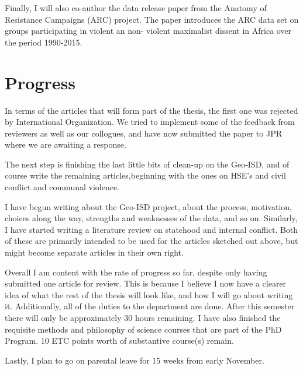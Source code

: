 \documentclass[12pt]{article}
\begin{document}
Finally, I will also co-author the data release paper from the Anatomy of 
Resistance Campaigns (ARC) project.
The paper introduces the ARC data set on groups participating in violent an non-
violent maximalist dissent in Africa over the period 1990-2015.




\section{Progress}

In terms of the articles that will form part of the thesis, the first one was
rejected by International Organization. We tried to implement some of the
feedback from reviewers as well as our collogues, and have now submitted the
paper to JPR where we are awaiting a response.  

The next step is finishing the last little bits of clean-up on the Geo-ISD, and
of course write the remaining articles,beginning with the ones on HSE's and
civil conflict and communal violence. 

I have begun writing about the Geo-ISD project, about the process, motivation,
choices along the way, strengths and weaknesses of the data, and so on. Similarly, I have
started writing a literature review on statehood and internal conflict. Both of
these are primarily intended to be used for the articles sketched out above,
but might become separate articles in their own right.

Overall I am content with the rate of progress so far, despite only having 
submitted one article for review.
This is because I believe I now have a clearer idea of what the rest of the 
thesis will look like, and how I will go about writing it.
Additionally, all of the duties to the department are done.
After this semester there will only be approximately 30 hours remaining.
I have also finished the requisite methods and philosophy of science courses 
that are part of the PhD Program.
10 ETC points worth of substantive course(s) remain.

Lastly, I plan to go on parental leave for 15 weeks from early November.

\pagebreak


\end{document}

